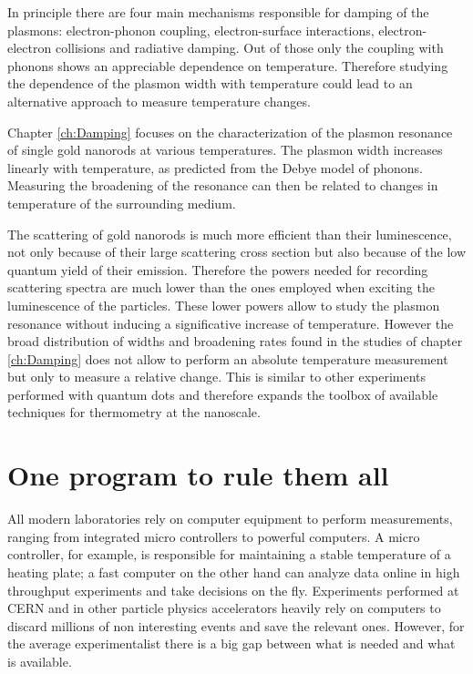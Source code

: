 In principle there are four main mechanisms responsible for damping of the
plasmons\cite{Sonnichsen2002,Novo2006,Hu2008}: electron-phonon coupling,
electron-surface interactions, electron-electron collisions and radiative
damping. Out of those only the coupling with phonons shows an appreciable
dependence on temperature\cite{Liu2009b,Konrad2013}. Therefore studying the
dependence of the plasmon width with temperature could lead to an alternative
approach to measure temperature changes.

Chapter \ref{ch:Damping} focuses on the characterization of the plasmon
resonance of single gold nanorods at various temperatures. The plasmon width
increases linearly with temperature, as predicted from the Debye model of
phonons. Measuring the broadening of the resonance can then be related to
changes in temperature of the surrounding medium. 

The scattering of gold nanorods is much more efficient than their luminescence,
not only because of their large scattering cross section but also because of the
low quantum yield of their emission. Therefore the powers needed for recording
scattering spectra are much lower than the ones employed when exciting the
luminescence of the particles. These lower powers allow to study the plasmon
resonance without inducing a significative increase of temperature. However the
broad distribution of widths and broadening rates found in the studies of
chapter \ref{ch:Damping} does not allow to perform an absolute temperature
measurement but only to measure a relative change. This is similar to other
experiments performed with quantum dots\cite{Yang2011a} and therefore expands
the toolbox of available techniques for thermometry at the nanoscale.

\section{One program to rule them all}
All modern laboratories rely on computer equipment to perform measurements,
ranging from integrated micro controllers to powerful computers. A micro
controller, for example, is responsible for maintaining a stable temperature of
a heating plate; a fast computer on the other hand can analyze data online in high
throughput experiments and take decisions on the fly. Experiments performed at
CERN and in other particle physics accelerators heavily rely on computers to
discard millions of non interesting events and save the relevant ones. However, 
for the average experimentalist there is a big gap between what is needed and
what is available.

